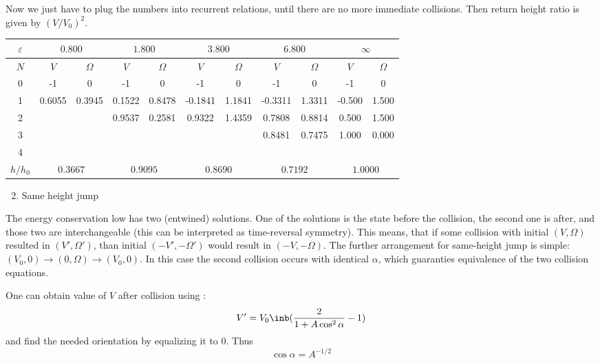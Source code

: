 Now we just have to plug the numbers into recurrent relations,
until there are no more immediate collisions.
Then return height ratio is given by $(V/V_0)^2$.
\begin{center}
\begin{tabular}{c|cc|cc|cc|cc|cc}
    $\varepsilon$ &
    \multicolumn{2}{c|}{$0.800$} &
    \multicolumn{2}{c|}{$1.800$} &
    \multicolumn{2}{c|}{$3.800$} &
    \multicolumn{2}{c|}{$6.800$} &
    \multicolumn{2}{c}{$\infty$}\\
    \hline
    $N$ & $V$ & $\Omega$ & $V$ & $\Omega$ & $V$ & $\Omega$ & $V$ & $\Omega$ & $V$ & $\Omega$ \\
    \hline
    0 & -1     & 0      & -1     & 0      & -1      & 0      & -1      & 0      & -1     & 0    \\
    1 & 0.6055 & 0.3945 & 0.1522 & 0.8478 & -0.1841 & 1.1841 & -0.3311 & 1.3311 & -0.500 & 1.500 \\
    2 &        &        & 0.9537 & 0.2581 & 0.9322  & 1.4359 & 0.7808  & 0.8814 & 0.500  & 1.500 \\
    3 &        &        &        &        &         &        & 0.8481  & 0.7475 & 1.000  & 0.000  \\
    4 &        &        &        &        &         &        &         &        &        &        \\
    \hline    
    $h/h_0$ &
    \multicolumn{2}{c|}{$0.3667$} &
    \multicolumn{2}{c|}{$0.9095$} &
    \multicolumn{2}{c|}{$0.8690$} &
    \multicolumn{2}{c|}{$0.7192$} &
    \multicolumn{2}{c}{$1.0000$}\\
    \hline
\end{tabular}
\end{center}

{\bfseries
\begin{enumerate}
    \setcounter{enumi}{1}
    \item Same height jump
\end{enumerate}
}

The energy conservation low has two (entwined) solutions.
One of the solutions is the state before the collision,
the second one is after, and those two are interchangeable
(this can be interpreted as time-reversal symmetry).
This means, that if some collision with initial $(V, \Omega)$
resulted in $(V', \Omega')$, than
initial $(-V', -\Omega')$ would result in $(-V, -\Omega)$.
The further arrangement for same-height jump is simple:
$(V_0, 0)\rightarrow(0,\Omega)\rightarrow(V_0, 0)$.
In this case the second collision occurs with identical $\alpha$,
which guaranties equivalence of the two collision equations.

One can obtain value of $V$ after collision using :
\begin{equation}
    V'=V_0 \inb({\frac{2}{1+A\cos^2\alpha}-1})
\end{equation}
and find the needed orientation by equalizing it to $0$. Thus
\begin{equation}
    \cos\alpha = A^{-1/2}
\end{equation}

